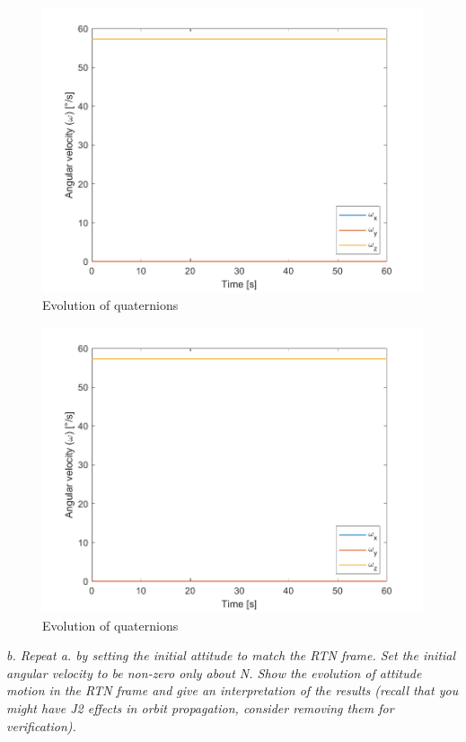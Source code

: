 \begin{figure}[H]
\centering
\includegraphics[scale=0.6]{Images/ps4_problem1a_angle.png}
\caption{Evolution of quaternions}
\label{fig:ps4_problem1a_angle}
\end{figure}

\begin{figure}[H]
\centering
\includegraphics[scale=0.6]{Images/ps4_problem1a_velocity.png}
\caption{Evolution of quaternions}
\label{fig:ps4_problem1a_velocity}
\end{figure}

\textit{b. Repeat a. by setting the initial attitude to match the RTN frame. Set the initial angular velocity to be non-zero only about N. Show the evolution of attitude motion in the RTN frame and give an interpretation of the results (recall that you might have J2 effects in orbit propagation, consider removing them for verification).}

